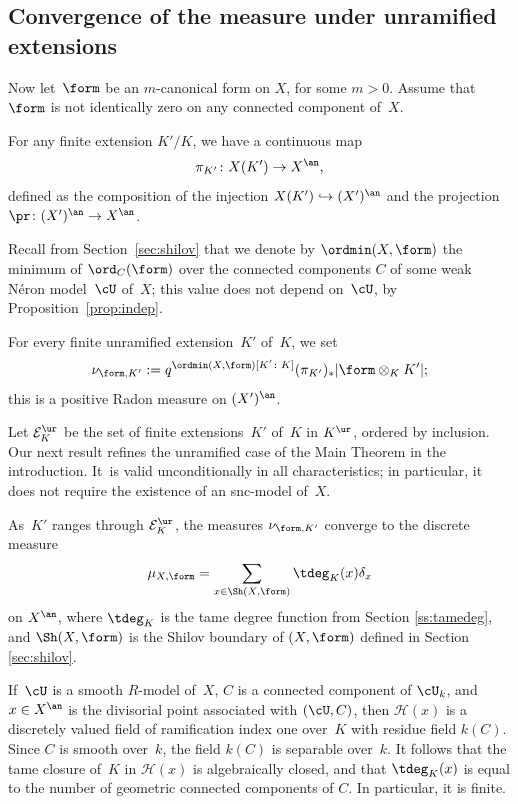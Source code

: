 \subsection{Convergence of the measure under unramified extensions}
Now let~$\form$ be an $m$-canonical form on $X$, for some $m>0$.
Assume that~$\form$ is not identically zero on any connected component of~$X$.

For any finite extension $K'/K$, we have a continuous map
\begin{equation*}
\pi_{K'}\colon X(K')\to X^{\an},
\end{equation*}
defined as the composition of the injection $X(K')\hookrightarrow(X')^{\an}$ and the projection $\pr\colon (X')^{\an}\to X^{\an}$.

Recall from Section~\ref{sec:shilov} that we denote by $\ordmin(X,\form)$ the minimum of
$\ord_C(\form)$ over the connected components $C$ of some weak Néron model~$\cU$ of~$X$; this value does not depend on~$\cU$, by Proposition~\ref{prop:indep}.

\begin{definition}\label{def:unram-measure}
For every finite unramified extension~$K'$ of~$K$, we set
\begin{equation*}
\nu_{\form,K'}:=q^{\ordmin(X,\form)[K'\colon K]}(\pi_{K'})_*|\form\otimes_K K'|;
\end{equation*}
this is a positive Radon measure on $(X')^{\an}$.
\end{definition}

Let $\mathcal{E}^{\ur}_K$ be the set of finite extensions~$K'$ of~$K$ in $K^{\ur}$, ordered by inclusion.
Our next result refines the unramified case of the Main Theorem in the introduction. It~is valid unconditionally in all characteristics; in particular, it does not require the existence of an snc-model of~$X$.

\begin{theorem}\label{thm:shi}
As~$K'$ ranges through $\mathcal{E}^{\ur}_K$, the measures $\nu_{\form,K'}$ converge to the discrete measure
\[
\mu_{X,\form}=\sum_{x\in \Sh(X,\form)}\tdeg_{K}(x)\delta_x
\]
on $X^{\an}$, where $\tdeg_K$ is the tame degree function from Section \ref{ss:tamedeg}, and $\Sh(X,\form)$ is the Shilov boundary of $(X,\form)$ defined in Section \ref{sec:shilov}.
\end{theorem}
If~$\cU$ is a smooth $R$\nobreakdash-model of~$X$, $C$ is a connected component of $\cU_k$, and $x\in X^{\an}$ is the divisorial point associated with $(\cU,C)$, then
$\mathscr{H}(x)$ is a discretely valued field of ramification index one over~$K$ with residue field $k(C)$. Since $C$ is smooth over~$k$, the field $k(C)$ is separable over~$k$.
It follows that the tame closure of~$K$ in $\mathscr{H}(x)$ is algebraically closed, and that
$\tdeg_K(x)$ is equal to the number of geometric connected components of $C$. In particular, it is finite.

